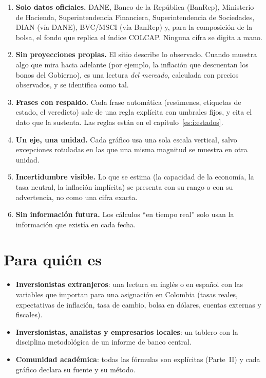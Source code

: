 \begin{enumerate}
\item \textbf{Solo datos oficiales.} DANE, Banco de la República (BanRep), Ministerio de Hacienda,
  Superintendencia Financiera, Superintendencia de Sociedades, DIAN (vía DANE), BVC/MSCI (vía BanRep) y,
  para la composición de la bolsa, el fondo que replica el índice COLCAP. Ninguna cifra se digita a mano.
\item \textbf{Sin proyecciones propias.} El sitio describe lo observado. Cuando muestra algo que mira hacia
  adelante (por ejemplo, la inflación que descuentan los bonos del Gobierno), es una lectura \emph{del
  mercado}, calculada con precios observados, y se identifica como tal.
\item \textbf{Frases con respaldo.} Cada frase automática (resúmenes, etiquetas de estado, el veredicto) sale
  de una regla explícita con umbrales fijos, y cita el dato que la sustenta. Las reglas están en el
  capítulo~\ref{es:i:estados}.
\item \textbf{Un eje, una unidad.} Cada gráfico usa una sola escala vertical, salvo excepciones rotuladas en
  las que una misma magnitud se muestra en otra unidad.
\item \textbf{Incertidumbre visible.} Lo que se estima (la capacidad de la economía, la tasa neutral, la
  inflación implícita) se presenta con su rango o con su advertencia, no como una cifra exacta.
\item \textbf{Sin información futura.} Los cálculos ``en tiempo real'' solo usan la información que existía en
  cada fecha.
\end{enumerate}

\section{Para quién es}
\begin{itemize}
\item \textbf{Inversionistas extranjeros}: una lectura en inglés o en español con las variables que importan
  para una asignación en Colombia (tasas reales, expectativas de inflación, tasa de cambio, bolsa en dólares,
  cuentas externas y fiscales).
\item \textbf{Inversionistas, analistas y empresarios locales}: un tablero con la disciplina metodológica de
  un informe de banco central.
\item \textbf{Comunidad académica}: todas las fórmulas son explícitas (Parte~II) y cada gráfico declara su
  fuente y su método.
\end{itemize}

